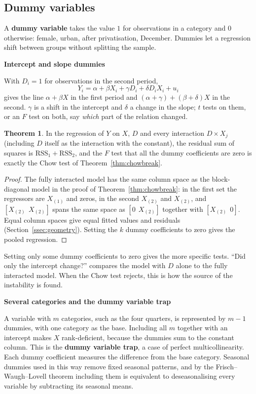 \documentclass[11pt,a4paper]{article}
\numberwithin{equation}{section}
\theoremstyle{definition}
\newtheorem{thm}{Theorem}[subsection]
\newcommand{\subhead}[1]{%
  \par\medskip\noindent\textbf{#1}\par\nobreak\smallskip}
\begin{document}
\subsection{Dummy variables}
\label{ssec:dummies}

A \textbf{dummy variable} takes the value $1$ for observations in a category and $0$ otherwise: female, urban, after privatisation, December. Dummies let a
regression shift between groups without splitting the sample.

\subhead{Intercept and slope dummies}
With $D_i = 1$ for observations in the second period,
\[
Y_i = \alpha + \beta X_i + \gamma D_i + \delta D_iX_i + u_i
\]
gives the line $\alpha + \beta X$ in the first period and $(\alpha + \gamma) + (\beta + \delta)X$ in the second. $\gamma$ is a shift in the intercept and $\delta$ a
change in the slope; $t$ tests on them, or an $F$ test on both, say \emph{which} part of the relation changed.

\begin{thm}
\label{thm:dummychow}
In the regression of $Y$ on $X$, $D$ and every interaction $D \times X_j$ (including $D$ itself as the interaction with the constant), the residual
sum of squares is $\text{RSS}_1 + \text{RSS}_2$, and the $F$ test that all the dummy coefficients are zero is exactly the Chow test of
Theorem~\ref{thm:chowbreak}.
\end{thm}

\begin{proof}
The fully interacted model has the same column space as the block-diagonal model in the proof of Theorem~\ref{thm:chowbreak}: in the first set
the regressors are $X_{(1)}$ and zeros, in the second $X_{(2)}$ and $X_{(2)}$, and $[X_{(2)}\ \ X_{(2)}]$ spans the same space as $[0\ \ X_{(2)}]$ together with
$[X_{(2)}\ \ 0]$. Equal column spaces give equal fitted values and residuals (Section~\ref{ssec:geometry}). Setting the $k$ dummy coefficients to zero
gives the pooled regression.
\end{proof}

Setting only some dummy coefficients to zero gives the more specific tests. ``Did only the intercept change?'' compares the model with $D$ alone to
the fully interacted model. When the Chow test rejects, this is how the source of the instability is found.

\subhead{Several categories and the dummy variable trap}
A variable with $m$ categories, such as the four quarters, is represented by $m - 1$ dummies, with one category as the base. Including all $m$
together with an intercept makes $X$ rank-deficient, because the dummies sum to the constant column. This is the \textbf{dummy variable trap},
a case of perfect multicollinearity. Each dummy coefficient measures the difference from the base category. Seasonal dummies used in this
way remove fixed seasonal patterns, and by the Frisch--Waugh--Lovell theorem including them is equivalent to deseasonalising every variable by
subtracting its seasonal means.
\end{document}
